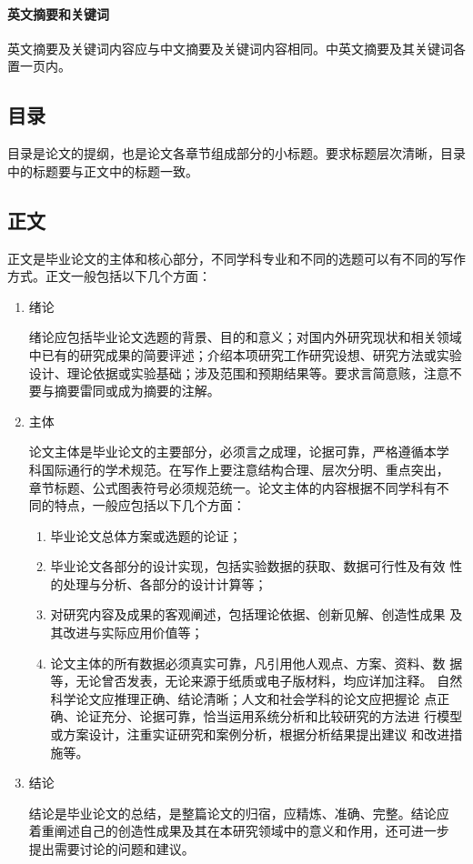 \paragraph{英文摘要和关键词}

英文摘要及关键词内容应与中文摘要及关键词内容相同。中英文摘要及其关键词各置一页内。

\subsection{目录}

目录是论文的提纲，也是论文各章节组成部分的小标题。要求标题层次清晰，目录中的标题要与正文中的标题一致。

\subsection{正文}

正文是毕业论文的主体和核心部分，不同学科专业和不同的选题可以有不同的写作方式。正文一般包括以下几个方面：

\begin{enumerate}
    \item 绪论\par
          绪论应包括毕业论文选题的背景、目的和意义；对国内外研究现状和相关领域中已有的研究成果的简要评述；介绍本项研究工作研究设想、研究方法或实验设计、理论依据或实验基础；涉及范围和预期结果等。要求言简意赅，注意不要与摘要雷同或成为摘要的注解。
    \item 主体\par
          论文主体是毕业论文的主要部分，必须言之成理，论据可靠，严格遵循本学
          科国际通行的学术规范。在写作上要注意结构合理、层次分明、重点突出，
          章节标题、公式图表符号必须规范统一。论文主体的内容根据不同学科有不
          同的特点，一般应包括以下几个方面：
          \begin{enumerate}
              \item 毕业论文总体方案或选题的论证；
              \item 毕业论文各部分的设计实现，包括实验数据的获取、数据可行性及有效
                    性的处理与分析、各部分的设计计算等；
              \item 对研究内容及成果的客观阐述，包括理论依据、创新见解、创造性成果
                    及其改进与实际应用价值等；
              \item 论文主体的所有数据必须真实可靠，凡引用他人观点、方案、资料、数
                    据等，无论曾否发表，无论来源于纸质或电子版材料，均应详加注释。
                    自然科学论文应推理正确、结论清晰；人文和社会学科的论文应把握论
                    点正确、论证充分、论据可靠，恰当运用系统分析和比较研究的方法进
                    行模型或方案设计，注重实证研究和案例分析，根据分析结果提出建议
                    和改进措施等。
          \end{enumerate}
    \item 结论\par
          结论是毕业论文的总结，是整篇论文的归宿，应精炼、准确、完整。结论应
          着重阐述自己的创造性成果及其在本研究领域中的意义和作用，还可进一步
          提出需要讨论的问题和建议。
\end{enumerate}

